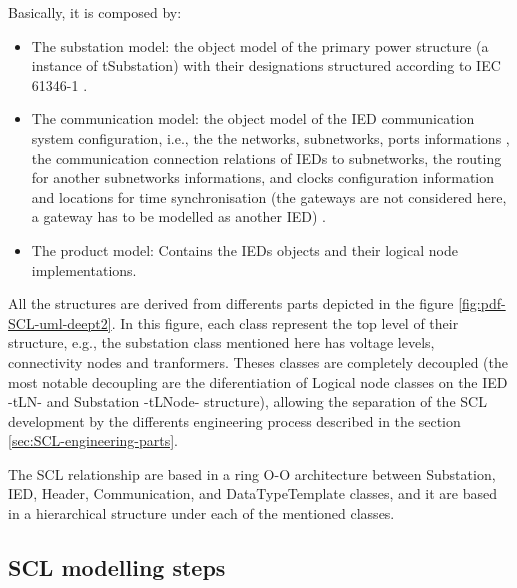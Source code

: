 

Basically, it is composed by: 



\begin{itemize}
  \item The substation model: the object model of the primary power structure
  		(a instance of tSubstation) with their designations structured according to 
  		IEC 61346-1 \cite{IEC61346-1:1996}. 
  \item The communication model: the object model of the IED 
  		communication system configuration, 
  		i.e.,
  		the the networks, subnetworks, ports informations
  		,
  		the communication connection relations of IEDs to 
  		subnetworks, the routing for another subnetworks informations, 
  		and clocks configuration information and locations for 
  		time synchronisation (the gateways are not considered here, 
  		a gateway has to be modelled as another IED)
  		.
  \item The product model: Contains the IEDs objects and their 
  		logical node implementations. 
\end{itemize}

All the structures are derived from differents 
parts depicted in the figure \ref{fig:pdf-SCL-uml-deept2}. 
In this figure, each class represent the top level 
of their structure, e.g., the substation class 
mentioned here has voltage levels, 
connectivity nodes and tranformers.   
Theses classes are completely decoupled 
(the most notable decoupling are the diferentiation of  
Logical node classes on the 
IED -t\gls{LN}- and Substation -t\gls{LNode}- structure), 
allowing the separation of the \gls{SCL} development 
by the differents engineering process 
described in the section \ref{sec:SCL-engineering-parts}.


The \gls{SCL} relationship are based in a 
ring \gls{O-O} architecture between Substation,
IED, Header, Communication, and DataTypeTemplate classes,
and it are based in a hierarchical structure under each of the 
mentioned classes.



\subsection{SCL modelling steps}

